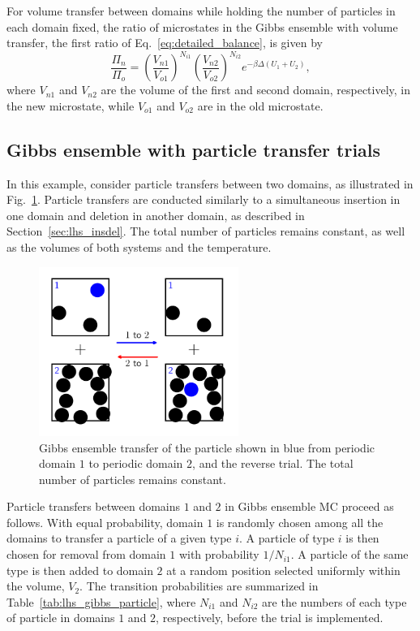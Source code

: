 \documentclass[
  9pt,
  bestpractices,
]{livecoms}
\begin{document}
For volume transfer between domains while holding the number of particles in each domain fixed, the ratio of microstates in the Gibbs ensemble with volume transfer, the first ratio of Eq.~\ref{eq:detailed_balance}, is given by
\begin{equation}
\frac{\Pi_{n}}{\Pi_{o}} = \left(\frac{V_{n1}}{V_{o1}}\right)^{N_{i1}}\left(\frac{V_{n2}}{V_{o2}}\right)^{N_{i2}}e^{-\beta\Delta (U_1+U_2)},
\label{eq:rhs_gibbs_volume}
\end{equation}
where $V_{n1}$ and $V_{n2}$ are the volume of the first and second domain, respectively, in the new microstate, while $V_{o1}$ and $V_{o2}$ are in the old microstate.

\subsection{\label{sec:lhs_gibbs_particle}Gibbs ensemble with particle transfer trials}

In this example, consider particle transfers between two domains, as illustrated in Fig.~\ref{fig:gibbs_particle}.
Particle transfers are conducted similarly to a simultaneous insertion in one domain and deletion in another domain, as described in Section~\ref{sec:lhs_insdel}.
The total number of particles remains constant, as well as the volumes of both systems and the temperature.

\begin{figure}
\begin{centering}
\includegraphics[width=6.5cm]{../figures/gibbs_particle.pdf}
\caption{
Gibbs ensemble transfer of the particle shown in blue from periodic domain $1$ to periodic domain $2$, and the reverse trial.
The total number of particles remains constant.
}
\label{fig:gibbs_particle}
\end{centering}
\end{figure}

Particle transfers between domains $1$ and $2$ in Gibbs ensemble MC proceed as follows.
With equal probability, domain $1$ is randomly chosen among all the domains to transfer a particle of a given type $i$.
A particle of type $i$ is then chosen for removal from domain $1$ with probability $1/N_{i1}$.
A particle of the same type is then added to domain $2$ at a random position selected uniformly within the volume, $V_2$.
The transition probabilities are summarized in Table~\ref{tab:lhs_gibbs_particle}, where $N_{i1}$ and $N_{i2}$ are the numbers of each type of particle in domains $1$ and $2$, respectively, before the trial is implemented.
\end{document}
